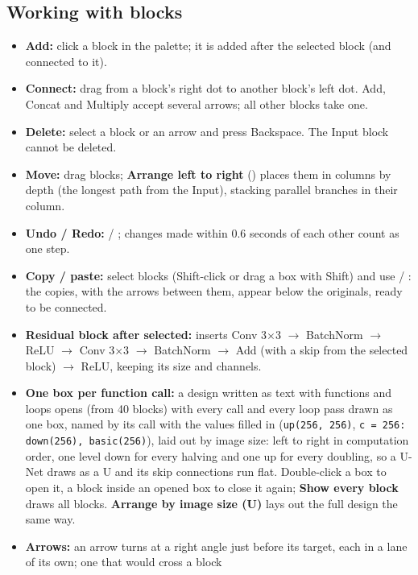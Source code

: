\documentclass[11pt,a4paper]{article}
\newcommand{\ui}[1]{\textbf{\textsf{#1}}}
\newcommand{\kbd}[1]{\mbox{\fboxsep=1.5pt\fbox{\footnotesize\texttt{#1}}}}
\begin{document}
\subsection{Working with blocks}
\begin{itemize}
  \item \textbf{Add:} click a block in the palette; it is added after the selected block (and connected to it).
  \item \textbf{Connect:} drag from a block's right dot to another block's left dot. Add, Concat and Multiply accept several arrows; all
        other blocks take one.
  \item \textbf{Delete:} select a block or an arrow and press Backspace. The Input block cannot be deleted.
  \item \textbf{Move:} drag blocks; \ui{Arrange left to right} (\kbd{Cmd+L}) places them in columns by depth (the longest path from the
        Input), stacking parallel branches in their column.
  \item \textbf{Undo / Redo:} \kbd{Cmd+Z} / \kbd{Shift+Cmd+Z}; changes made within 0.6 seconds of each other count as one step.
  \item \textbf{Copy / paste:} select blocks (Shift-click or drag a box with Shift) and use \kbd{Cmd+C} / \kbd{Cmd+V}: the copies, with the
        arrows between them, appear below the originals, ready to be connected.
  \item \textbf{Residual block after selected:} inserts Conv 3$\times$3 $\rightarrow$ BatchNorm $\rightarrow$ ReLU $\rightarrow$ Conv
        3$\times$3 $\rightarrow$ BatchNorm $\rightarrow$ Add (with a skip from the selected block) $\rightarrow$ ReLU, keeping its size and channels.
  \item \textbf{One box per function call:} a design written as text with functions and loops opens (from 40 blocks) with every call and
        every loop pass drawn as one box, named by its call with the values filled in (\texttt{up(256, 256)}, \texttt{c = 256: down(256),
        basic(256)}), laid out by image size: left to right in computation order, one level down for every halving and one up for every
        doubling, so a U-Net draws as a U and its skip connections run flat. Double-click a box to open it, a block inside an opened box to
        close it again; \ui{Show every block} draws all blocks. \ui{Arrange by image size (U)} lays out the full design the same way.
  \item \textbf{Arrows:} an arrow turns at a right angle just before its target, each in a lane of its own; one that would cross a block

\end{itemize}
\end{document}
